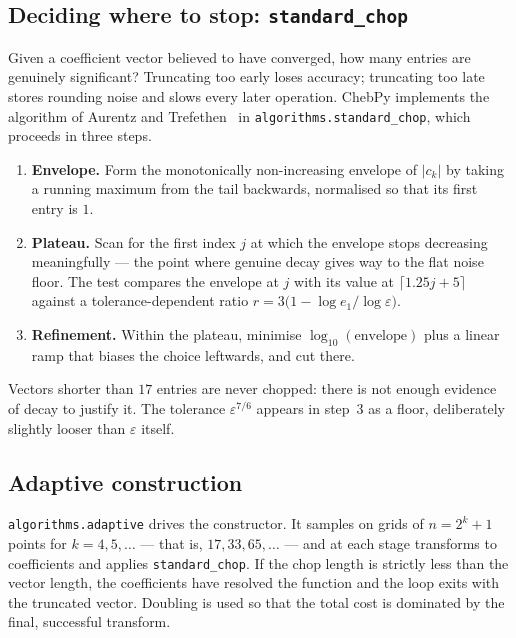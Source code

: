 \documentclass[11pt,a4paper]{article}
\newcommand{\code}[1]{\texttt{#1}}
\begin{document}
\subsection{Deciding where to stop: \texttt{standard\_chop}}
\label{sec:chop}

Given a coefficient vector believed to have converged, how many entries are
genuinely significant? Truncating too early loses accuracy; truncating too late
stores rounding noise and slows every later operation. ChebPy implements the
algorithm of Aurentz and Trefethen~\cite{aurentz2015} in
\code{algorithms.standard\_chop}, which proceeds in three steps.

\begin{enumerate}
  \item \textbf{Envelope.} Form the monotonically non-increasing envelope of
        $|c_k|$ by taking a running maximum from the tail backwards, normalised
        so that its first entry is $1$.
  \item \textbf{Plateau.} Scan for the first index $j$ at which the envelope
        stops decreasing meaningfully --- the point where genuine decay gives
        way to the flat noise floor. The test compares the envelope at $j$ with
        its value at $\lceil 1.25 j + 5 \rceil$ against a tolerance-dependent
        ratio $r = 3\bigl(1 - \log e_1 / \log \varepsilon\bigr)$.
  \item \textbf{Refinement.} Within the plateau, minimise
        $\log_{10}(\text{envelope})$ plus a linear ramp that biases the choice
        leftwards, and cut there.
\end{enumerate}

Vectors shorter than $17$ entries are never chopped: there is not enough
evidence of decay to justify it. The tolerance $\varepsilon^{7/6}$ appears in
step~3 as a floor, deliberately slightly looser than $\varepsilon$ itself.

\subsection{Adaptive construction}
\label{sec:adaptive}

\code{algorithms.adaptive} drives the constructor. It samples on grids of
$n = 2^k + 1$ points for $k = 4, 5, \ldots$ --- that is, $17, 33, 65, \ldots$
--- and at each stage transforms to coefficients and applies
\code{standard\_chop}. If the chop length is strictly less than the vector
length, the coefficients have resolved the function and the loop exits with the
truncated vector. Doubling is used so that the total cost is dominated by the
final, successful transform.
\end{document}
